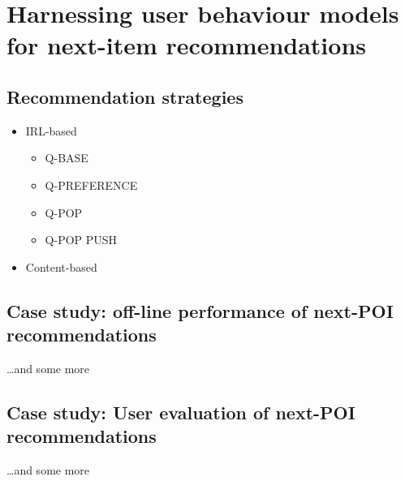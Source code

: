\chapter{Harnessing user behaviour models for next-item recommendations}

\ifpdf
    \graphicspath{{Chapter5/Figs/Raster/}{Chapter5/Figs/PDF/}{Chapter5/Figs/}}
\else
    \graphicspath{{Chapter5/Figs/Vector/}{Chapter5/Figs/}}
\fi

\section{Recommendation strategies}
\begin{itemize}
\item IRL-based
\begin{itemize}
	\item Q-BASE
	\item Q-PREFERENCE
	\item Q-POP
	\item Q-POP PUSH
\end{itemize}
\item Content-based
\end{itemize}

\section{Case study: off-line performance of next-POI recommendations}
\dots and some more 

\section{Case study: User evaluation of next-POI recommendations}
\dots and some more 

